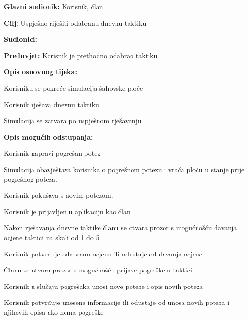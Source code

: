 					\noindent {}
					\begin{packed_item}
	
						\item \textbf{Glavni sudionik: }Korisnik, član
						\item  \textbf{Cilj: } Uspješno riješiti odabranu dnevnu taktiku
						\item  \textbf{Sudionici: }-
						\item  \textbf{Preduvjet: }Korisnik je prethodno odabrao taktiku
						\item  \textbf{Opis osnovnog tijeka:}
						
						\item[] \begin{packed_enum}
	
							\item Korisniku se pokreće simulacija šahovske ploče
							\item Korisnik rješava dnevnu taktiku
							\item Simulacija se zatvara po uspješnom rješavanju
							
						\end{packed_enum}
						
						\item  \textbf{Opis mogućih odstupanja:}
						
						\item[] \begin{packed_item}
	
							
							\item[2.a] Korisnik napravi pogrešan potez
							\item[] \begin{packed_enum}
								
								\item Simulacija obavještava korisnika o pogrešnom potezu i vraća ploču u stanje prije pogrešnog poteza.
								\item Korisnik pokušava s novim potezom.
								
								
							\end{packed_enum}
						
						\item[3.a] Korisnik je prijavljen u aplikaciju kao član
						\item[] \begin{packed_enum}
							
							\item Nakon rješavanja dnevne taktike članu se otvara prozor s mogućnošću davanja ocjene taktici na skali od 1 do 5
							\item Korisnik potvrđuje odabranu ocjenu ili odustaje od davanja ocjene
							\item Članu se otvara prozor s mogućnošću prijave pogreške u taktici
							\item Korisnik u slučaju pogrešaka unosi nove poteze i opis novih poteza
							\item Korisnik potvrđuje unesene informacije ili odustaje od unosa novih poteza i njihovih opisa ako nema pogreške
							

\end{packed_enum}
\end{packed_item}
\end{packed_item}
